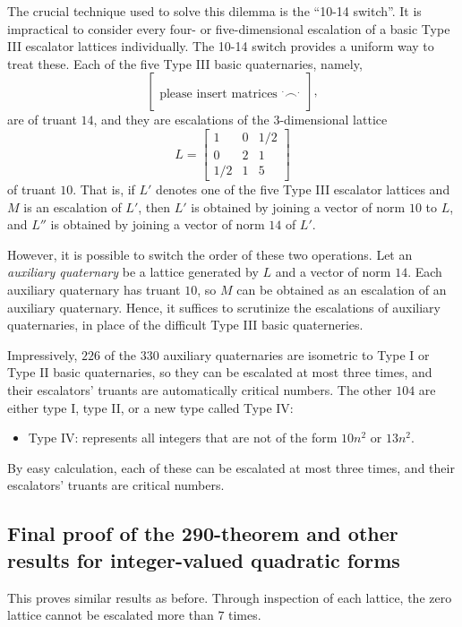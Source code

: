 \documentclass{article}
\begin{document}
The crucial technique used to solve this dilemma is the ``10-14 switch''.
It is impractical to consider every four- or five-dimensional escalation of a basic Type III escalator lattices individually.
The 10-14 switch provides a uniform way to treat these.
Each of the five Type III basic quaternaries, namely,
\[\begin{bmatrix} \\ \\ \text{please insert matrices }^.\frown\text{}^. \\{} \end{bmatrix},\]
are of truant $14$, and they are escalations of the $3$-dimensional lattice
\[L = \begin{bmatrix} 1 & 0 & 1/2 \\ 0 & 2 & 1 \\ 1/2 & 1 & 5 \end{bmatrix}\]
of truant $10$.
That is, if $L'$ denotes one of the five Type III escalator lattices and $M$ is an escalation of $L'$, then $L'$ is obtained by joining a vector of norm $10$ to $L$, and $L''$ is obtained by joining a vector of norm $14$ of $L'$.

However, it is possible to switch the order of these two operations.
Let an \emph{auxiliary quaternary} be a lattice generated by $L$ and a vector of norm $14$.
Each auxiliary quaternary has truant $10$, so $M$ can be obtained as an escalation of an auxiliary quaternary.
Hence, it suffices to scrutinize the escalations of auxiliary quaternaries, in place of the difficult Type III basic quaterneries.

Impressively, $226$ of the $330$ auxiliary quaternaries are isometric to Type I or Type II basic quaternaries, so they can be escalated at most three times, and their escalators' truants are automatically critical numbers. The other $104$ are either type I, type II, or a new type called Type IV:
\begin{itemize}
    \item Type IV: represents all integers that are not of the form $10n^2$ or $13n^2$.
\end{itemize}
By easy calculation, each of these can be escalated at most three times, and their escalators' truants are critical numbers.

\subsection{Final proof of the 290-theorem and other results for integer-valued quadratic forms}
This proves similar results as before. Through inspection of each lattice, the zero lattice cannot be escalated more than $7$ times.
\end{document}
